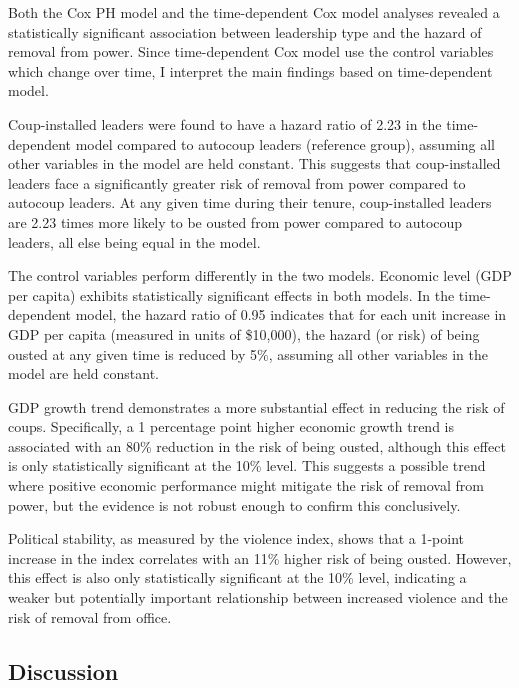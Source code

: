 \documentclass[
  12pt,
]{report}
\begin{document}
Both the Cox PH model and the time-dependent Cox model analyses revealed
a statistically significant association between leadership type and the
hazard of removal from power. Since time-dependent Cox model use the
control variables which change over time, I interpret the main findings
based on time-dependent model.

Coup-installed leaders were found to have a hazard ratio of 2.23 in the
time-dependent model compared to autocoup leaders (reference group),
assuming all other variables in the model are held constant. This
suggests that coup-installed leaders face a significantly greater risk
of removal from power compared to autocoup leaders. At any given time
during their tenure, coup-installed leaders are 2.23 times more likely
to be ousted from power compared to autocoup leaders, all else being
equal in the model.

The control variables perform differently in the two models. Economic
level (GDP per capita) exhibits statistically significant effects in
both models. In the time-dependent model, the hazard ratio of 0.95
indicates that for each unit increase in GDP per capita (measured in
units of \$10,000), the hazard (or risk) of being ousted at any given
time is reduced by 5\%, assuming all other variables in the model are
held constant.

GDP growth trend demonstrates a more substantial effect in reducing the
risk of coups. Specifically, a 1 percentage point higher economic growth
trend is associated with an 80\% reduction in the risk of being ousted,
although this effect is only statistically significant at the 10\%
level. This suggests a possible trend where positive economic
performance might mitigate the risk of removal from power, but the
evidence is not robust enough to confirm this conclusively.

Political stability, as measured by the violence index, shows that a
1-point increase in the index correlates with an 11\% higher risk of
being ousted. However, this effect is also only statistically
significant at the 10\% level, indicating a weaker but potentially
important relationship between increased violence and the risk of
removal from office.

\subsection{Discussion}\label{discussion}
\end{document}
